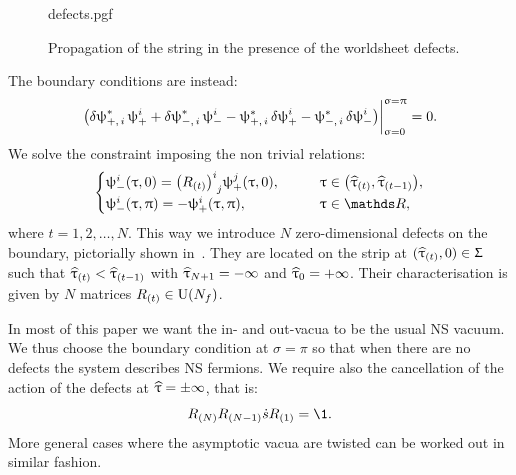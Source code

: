 \begin{figure}[tbp]
  \centering
  {defects.pgf}
  \caption{Propagation of the string in the presence of the worldsheet defects.}
  \label{fig:point-like-defects}
\end{figure}
The boundary conditions are instead:
\begin{equation}
  \eval{
    \qty(
      \var{\psi}_{+,\, i}^* \psi_{+}^{ i} +
      \var{\psi}_{-,\, i}^* \psi_{-}^{ i} -
      \psi_{+,\, i}^* \var{\psi}_{+}^{ i} -
      \psi_{-,\, i}^* \var{\psi}_{-}^{ i}
    )
  }_{\sigma = 0}^{\sigma = \pi} = 0.
  \label{eq:boundary-conditions}
\end{equation}
We solve the constraint imposing the non trivial relations:
\begin{equation}
  \begin{cases}
    \psi_-^i( \tau, 0 )
    =
    \tensor{\qty( R_{(t)} )}{^i_j}
    \psi^j_+( \tau, 0 ),
    & \qquad
    \tau \in \qty( \htau_{(t)}, \htau_{(t-1)} ),
    \\
    \psi_-^i( \tau, \pi )
    =
    - \psi_+^i( \tau, \pi ),
    & \qquad
    \tau \in \R,
  \end{cases}
  \label{eq:boundary-conditions-solutions}
\end{equation}
where $t = 1, 2, \dots, N$.
This way we introduce $N$ zero-dimensional defects on the boundary, pictorially shown in~.
They are located on the strip at $( \widehat{\uptau}_{(t)}, 0 ) \in \Upsigma$ such that $\widehat{\uptau}_{(t)} < \widehat{\uptau}_{(t-1)}$ with $\widehat{\uptau}_{N+1} = -\infty$ and $\widehat{\uptau}_0 = +\infty$.
Their characterisation is given by $N$ matrices $R_{(t)} \in \mathrm{U}(N_f)$.
    
In most of this paper we want the in- and out-vacua to be the usual NS vacuum.
We thus choose the boundary condition at $\sigma = \pi$ so that when there are no defects the system describes NS fermions.
We require also the cancellation of the action of the defects at $\widehat{\uptau} = \pm\infty$, that is:
\begin{equation}
  R_{(N)} R_{(N-1)} \dots R_{(1)} = \1.
\end{equation}
More general cases where the asymptotic vacua are twisted can be worked out in similar fashion.
   
